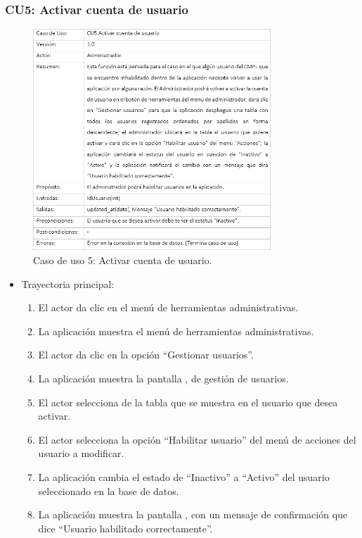 \newpage
			
		\subsubsection{CU5: Activar cuenta de usuario}
			\begin{figure}[htbp!]
				\centering
					\includegraphics[width=0.8\textwidth]{images/CU/CU5}
					\caption{Caso de uso 5: Activar cuenta de usuario.}
				\label{Tabla}
			\end{figure}
			
			\begin{itemize}
				\item Trayectoria principal:
					\begin{enumerate}
						\item El actor da clic en el menú de herramientas administrativas.
						\item La aplicación muestra el menú de herramientas administrativas.
						\item El actor da clic en la opción ``Gestionar usuarios''.
						\item La aplicación muestra la pantalla , de gestión de usuarios.
						\item El actor selecciona de la tabla que se muestra en  el usuario que desea activar.
						\item El actor selecciona la opción ``Habilitar usuario'' del menú de acciones del usuario a modificar.
						\item La aplicación cambia el estado de ``Inactivo'' a ``Activo'' del usuario seleccionado en la base de datos.
						\item La aplicación muestra la pantalla , con un mensaje de confirmación que dice ``Usuario habilitado correctamente''.
					\end{enumerate}
			\end{itemize}
			
